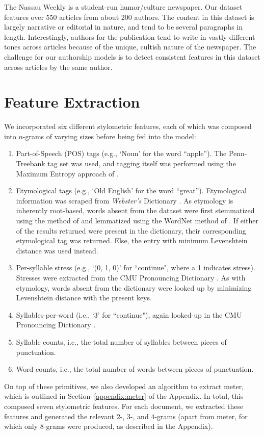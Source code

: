 \documentclass[14pt]{article} %
\theoremstyle{plain}
\theoremstyle{definition}
\theoremstyle{remark}
\begin{document}
The Nassau Weekly is a student-run humor/culture newspaper. Our dataset features over 550 articles from about 200 authors. The content in this dataset is largely narrative or editorial in nature, and tend to be several paragraphs in length. Interestingly, authors for the publication tend to write in vastly different tones across articles because of the unique, cultish nature of the newspaper. The challenge for our authorship models is to detect consistent features in this dataset across articles by the same author.

\section{Feature Extraction}

We incorporated six different stylometric features, each of which was composed into $n$-grams of varying sizes before being fed into the model:
\begin{enumerate}
\item Part-of-Speech (POS) tags (e.g., `Noun' for the word ``apple''). The Penn-Treebank tag set was used, and tagging itself was performed using the Maximum Entropy approach of \citet{Ratnaparkhi}.
\item Etymological tags (e.g., `Old English' for the word ``great''). Etymological information was scraped from \textit{Webster's} Dictionary \citep{Dictionary}. As etymology is inherently root-based, words absent from the dataset were first stemmatized using the method of \citet{Porter} and lemmatized using the WordNet method of \citet{Fellbaum}. If either of the results returned were present in the dictionary, their corresponding etymological tag was returned. Else, the entry with minimum Levenshtein distance \citep{Levenshtein} was used instead.
\item Per-syllable stress (e.g., `(0, 1, 0)' for ``continue", where a 1 indicates stress). Stresses were extracted from the CMU Pronouncing Dictionary \citep{Lenzo}. As with etymology, words absent from the dictionary were looked up by minimizing Levenshtein distance with the present keys.
\item Syllables-per-word (i.e., `3' for ``continue"), again looked-up in the CMU Pronouncing Dictionary \citep{Lenzo}.
\item Syllable counts, i.e., the total number of syllables between pieces of punctuation.
\item Word counts, i.e., the total number of words between pieces of punctuation.
\end{enumerate}On top of these primitives, we also developed an algorithm to extract meter, which is outlined in Section~\ref{appendix:meter} of the Appendix. In total, this composed seven stylometric features. For each document, we extracted these features and generated the relevant $2$-, $3$-, and $4$-grams (apart from meter, for which only $8$-grams were produced, as described in the Appendix).
\end{document}
